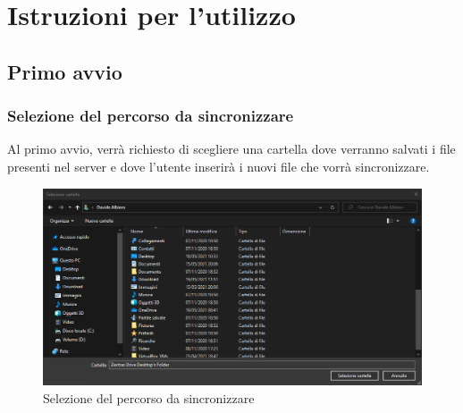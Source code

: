 \section{Istruzioni per l'utilizzo}

\subsection{Primo avvio}
\subsubsection{Selezione del percorso da sincronizzare}
\label{sec:selezionepath}
Al primo avvio, verrà richiesto di scegliere una cartella dove verranno salvati i file presenti nel server e dove l'utente inserirà i nuovi file che vorrà sincronizzare.
\begin{figure}[H]
    \centering
    \includegraphics[scale = 0.50]{components/img/selezione-path.png}
    \caption{Selezione del percorso da sincronizzare}
    \label{fig:Selezione del percorso da sincronizzare}
\end{figure}


